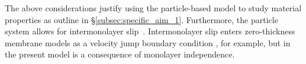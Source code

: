 The above considerations justify using the particle-based model to study material properties 
as outline in \S \ref{subsec:specific_aim_1}. Furthermore, the particle system allows
for intermonolayer slip~\cite{SHKULIPA2005823, ShkulipaThesis}.
Intermonolayer slip enters zero-thickness membrane models as a velocity
jump boundary condition \cite{schwalbe_vlahovska_miksis_2010}, for example, 
but in the present model is a consequence of monolayer independence.




